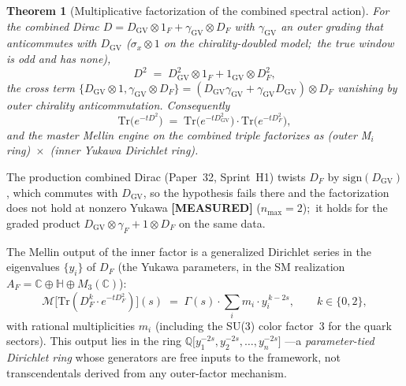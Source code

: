 \documentclass[aps,pra,twocolumn,superscriptaddress,longbibliography]{revtex4-2}
\newtheorem{theorem}{Theorem}
\begin{document}
\begin{theorem}[Multiplicative factorization of the combined
spectral action]
\label{thm:ac_factorization}
For the combined Dirac $D = D_{\mathrm{GV}} \otimes 1_F + \gamma_{\mathrm{GV}}
\otimes D_F$ with $\gamma_{\mathrm{GV}}$ an outer grading that
anticommutes with $D_{\mathrm{GV}}$ ($\sigma_x \otimes 1$ on the
chirality-doubled model;\ the true window is odd and has none),
\begin{equation}\label{eq:d_squared_factorize}
  D^2 \;=\; D_{\mathrm{GV}}^2 \otimes 1_F + 1_{\mathrm{GV}}
            \otimes D_F^2,
\end{equation}
the cross term $\{D_{\mathrm{GV}} \otimes 1, \gamma_{\mathrm{GV}}
\otimes D_F\} = (D_{\mathrm{GV}}\gamma_{\mathrm{GV}} +
\gamma_{\mathrm{GV}}D_{\mathrm{GV}}) \otimes D_F$ vanishing by
outer chirality anticommutation.  Consequently
\begin{equation}\label{eq:trace_factorize}
  \mathrm{Tr}\bigl(e^{-tD^2}\bigr)
  \;=\; \mathrm{Tr}\bigl(e^{-tD_{\mathrm{GV}}^2}\bigr)
        \cdot \mathrm{Tr}\bigl(e^{-tD_F^2}\bigr),
\end{equation}
and the master Mellin engine on the combined triple factorizes as
(outer M$_i$ ring)~$\times$~(inner Yukawa Dirichlet ring).
\end{theorem}

\noindent The production combined Dirac (Paper~32, Sprint~H1) twists
$D_F$ by $\mathrm{sign}(D_{\mathrm{GV}})$, which commutes with
$D_{\mathrm{GV}}$, so the hypothesis fails there and the factorization
does not hold at nonzero Yukawa \textbf{[MEASURED]} ($n_{\max} = 2$);\ it
holds for the graded product $D_{\mathrm{GV}} \otimes \gamma_F + 1
\otimes D_F$ on the same data.

The Mellin output of the inner factor is a generalized Dirichlet
series in the eigenvalues $\{y_i\}$ of $D_F$ (the Yukawa parameters,
in the SM realization $A_F = \mathbb{C} \oplus \mathbb{H} \oplus
M_3(\mathbb{C})$):
\begin{equation}\label{eq:inner_dirichlet}
  \mathcal{M}\bigl[\mathrm{Tr}(D_F^k \cdot e^{-t D_F^2})\bigr](s)
  \;=\; \Gamma(s) \cdot \sum_i m_i \cdot y_i^{\,k - 2s},
  \qquad k \in \{0, 2\},
\end{equation}
with rational multiplicities $m_i$ (including the SU(3) color
factor~3 for the quark sectors).  This output lies in the ring
$\mathbb{Q}\bigl[y_1^{-2s}, y_2^{-2s}, \ldots, y_n^{-2s}\bigr]$
---a \emph{parameter-tied Dirichlet ring} whose generators are
free inputs to the framework, not transcendentals derived from any
outer-factor mechanism.
\end{document}
